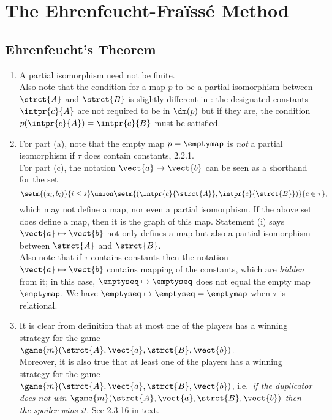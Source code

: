 \chapter{The Ehrenfeucht-Fra\"{i}ss\'{e} Method}
\setcounter{section}{1}
\section{Ehrenfeucht's Theorem}
\begin{enumerate}[1.]
%
\item {} A partial isomorphism need not be finite.
\medskip\\
Also note that the condition for a map $p$ to be a partial isomorphism between $\strct{A}$ and $\strct{B}$ is slightly different in \cite{EFT}: the designated constants $\intpr{c}{A}$ are not required to be in $\dm(p)$ but if they are, the condition $p(\intpr{c}{A}) = \intpr{c}{B}$ must be satisfied.
%
\item {} For part (a), note that the empty map $p = \emptymap$ is \emph{not} a partial isomorphism if $\tau$ does contain constants, 2.2.1.
\medskip\\
For part (c), the notation $\vect{a} \mapsto \vect{b}$ can be seen as a shorthand for the set
\[
\setm{(a_i, b_i)}{i \leq s} \union \setm{(\intpr{c}{\strct{A}}, \intpr{c}{\strct{B}})}{c \in \tau},\]
which may not define a map, nor even a partial isomorphism. If the above set does define a map, then it is the graph of this map. Statement (i) says $\vect{a} \mapsto \vect{b}$ not only defines a map but also a partial isomorphism between $\strct{A}$ and $\strct{B}$.
\medskip\\
Also note that if $\tau$ contains constants then the notation $\vect{a} \mapsto \vect{b}$ contains mapping of the constants, which are \emph{hidden} from it; in this case, $\emptyseq \mapsto \emptyseq$ does not equal the empty map $\emptymap$. We have $\emptyseq \mapsto \emptyseq = \emptymap$ when $\tau$ is relational.
%
\item {} It is clear from definition that at most one of the players has a winning strategy for the game $\game{m}(\strct{A}, \vect{a}, \strct{B}, \vect{b})$.
\medskip\\
Moreover, it is also true that at least one of the players has a winning strategy for the game $\game{m}(\strct{A}, \vect{a}, \strct{B}, \vect{b})$, i.e.\ \emph{if the duplicator does not win $\game{m}(\strct{A}, \vect{a}, \strct{B}, \vect{b})$ then the spoiler wins it.} See 2.3.16 in text.

\end{enumerate}
